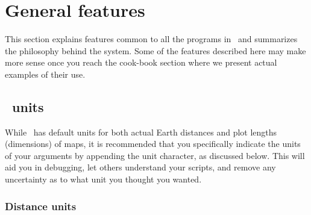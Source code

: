 %
%
\chapter{General features}
\label{ch:4}
\thispagestyle{headings}

This section explains features common to all the programs
in \GMT\ and summarizes the philosophy behind the system.  Some
of the features described here may make more sense once you reach
the cook-book section where we present actual examples of their use. 

\section{\gmt\ units}

While \GMT\ has default units for both actual Earth distances and
plot lengths (dimensions) of maps, it is recommended that you specifically indicate
the units of your arguments by appending the unit character, as discussed below.
This will aid you in debugging, let others understand your scripts, and remove
any uncertainty as to what unit you thought you wanted.

\subsection{Distance units}

